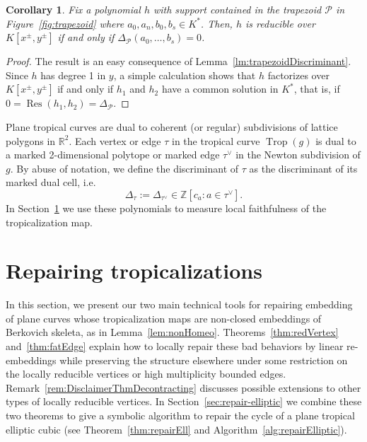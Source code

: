 \documentclass[11pt]{amsart}
\numberwithin{equation}{section}
\theoremstyle{plain}
\newtheorem{corollary}[theorem]{Corollary}
\theoremstyle{definition}
\theoremstyle{remark}
\begin{document}
\begin{corollary}\label{cor:highMultAndDiscrim}
  Fix a polynomial $h$ with support contained in the trapezoid ${\mathcal{P}}$
  in Figure~\ref{fig:trapezoid} where $a_0,a_n,b_0,b_s\in K^*$. Then,
  $h$ is reducible over $K[x^{\pm},y^{\pm}]$ if and only if
  $\Delta_{\mathcal{P}}(a_0,\ldots, b_s)=0$.
\end{corollary}
\begin{proof} The result is an easy consequence of
  Lemma~\ref{lm:trapezoidDiscriminant}.  Since $h$ has degree 1 in
  $y$, a simple calculation shows that $h$ factorizes over
  $K[x^{\pm},y^{\pm}]$ if and only if $h_1$ and $h_2$ have a common
  solution in $K^*$, that is, if
  $0=\operatorname{Res}(h_1,h_2)=\Delta_{\mathcal{P}}$.
\end{proof}

Plane tropical curves are dual to coherent (or regular) subdivisions of lattice polygons in
${\mathbb{R}}^2$. Each vertex or edge $\tau$ in the tropical curve $\operatorname{Trop}(g)$
is dual to a marked 2-dimensional polytope or marked edge
$\tau^{\vee}$ in the Newton subdivision of $g$. By abuse of notation, we define the discriminant of $\tau$
as the discriminant of its marked dual cell, i.e.
 \[
\Delta_{\tau}:=\Delta_{\tau^{\vee}}\in {\mathbb{Z}}[c_a:a\in \tau^{\vee}].\]
In Section~\ref{sec:repa-trop} we use these polynomials to measure local
faithfulness of the tropicalization map.

\section{Repairing tropicalizations}\label{sec:repa-trop}

In this section, we present our two main technical tools for repairing embedding of plane curves whose tropicalization maps are
non-closed embeddings of Berkovich skeleta, as in Lemma~\ref{lem:nonHomeo}. Theorems~\ref{thm:redVertex} and~\ref{thm:fatEdge} explain how  to locally
repair these bad behaviors by linear re-embeddings while
preserving the structure elsewhere under some restriction on the
locally reducible vertices or high multiplicity bounded edges.
Remark~\ref{rem:DisclaimerThmDecontracting} discusses possible
extensions to other types of locally reducible vertices.  In
Section~\ref{sec:repair-elliptic} we combine these two theorems to
give a symbolic algorithm to repair the cycle of a plane tropical
elliptic cubic (see Theorem~\ref{thm:repairEll} and Algorithm~\ref{alg:repairElliptic}).
\end{document}
